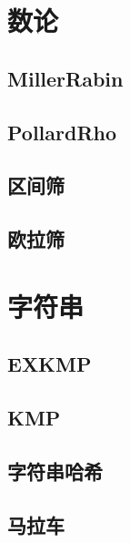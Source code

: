 \documentclass{article}
\begin{document}
\begin{multicols*}{2}
\section{数论}
\subsection{MillerRabin}

\subsection{PollardRho}

\subsection{区间筛}

\subsection{欧拉筛}

\section{字符串}
\subsection{EXKMP}

\subsection{KMP}

\subsection{字符串哈希}

\subsection{马拉车}

\end{multicols*}
\end{document}
